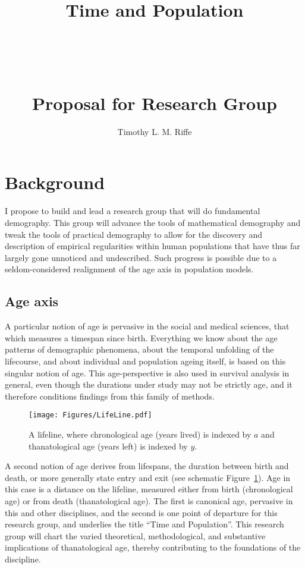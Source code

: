 \documentclass[a4paper,12pt]{article}
\begin{document}
\title{\vspace{-15mm}
\fontsize{25pt}{10pt}\selectfont
\textbf{
\hfill
\Huge{Time} \huge{and} \Huge{Population} \hfill\hfill 
} \\ ~ \\~ \\~ \\ \huge{Proposal for Research Group}}
\author{Timothy L. M. Riffe}
\maketitle

\onehalfspacing

\section{Background}

I propose to build and lead a research group that will do fundamental
demography. This group will advance the tools of mathematical demography and
tweak the tools of practical demography to allow for the discovery and description of empirical regularities
within human populations that have thus far largely gone unnoticed and
undescribed. Such progress is possible due to a seldom-considered realignment of
the age axis in population models. 

\subsection*{Age axis}
A particular notion of age is pervasive in the social and medical sciences, that
which measures a timespan since birth.
Everything we know about the age patterns of demographic phenomena, about the temporal
unfolding of the lifecourse, and about individual and population ageing itself,
is based on this singular notion of age. This age-perspective is also used in
survival analysis in general, even though the durations under study may not be
strictly age, and it therefore conditions findings from this
family of methods.

\begin{figure}[h]
\centering
	\caption{A lifeline, where chronological age (years lived) is indexed by $a$
	and thanatological age (years left) is indexed by $y$.}
	\label{fig:line}
	\texttt{[image: Figures/LifeLine.pdf]}	
\end{figure}

A second notion of age derives from lifespans, the duration between birth and
death, or more generally state entry and exit (see schematic
Figure~\ref{fig:line}).
Age in this case is a distance on the lifeline, measured either from birth (chronological age) or from death
(thanatological age). The first is canonical age, pervasive in this and
other disciplines, and the second is one point of departure for this research
group, and underlies the title ``Time and Population''. This research group
will chart the varied theoretical, methodological, and substantive
implications of thanatological age, thereby contributing to the foundations of the discipline.
\end{document}
